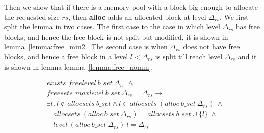 Then we show that if there is a memory pool with a block big enough to allocate the requested size $rs$, then \textbf{alloc} adds an allocated block at level $\Delta_{rs}$. We first split the lemma in two cases. The first case to the case in which level $\Delta_{rs}$ has free blocks, and hence the free block is not split but modified, it is shown in lemma~\ref{lemma:free_min2}. The second case is when $\Delta_{rs}$ does not have free blocks, and hence a free block in a level $l < \Delta_{rs}$ is split till reach level $\Delta_{rs}$ and it is shown in lemma lemma~\ref{lemma:free_nomin}.


\begin{lemma} 
\label{lemma:free_min2}
\end{lemma}
\vspace{-7pt}
\begin{align*}
&exists\_freelevel\ b\_set\ \Delta_{rs}\ \wedge\\
&freesets\_maxlevel\ b\_set\ \Delta_{rs} = \Delta_{rs} \longrightarrow\\ 
&\exists l.\ l \notin allocsets\ b\_set \wedge l \in allocsets\ (alloc\ b\_set\ \Delta_{rs})\ \wedge\\
&\ \ \ \ allocsets\ (alloc\ b\_set\ \Delta_{rs}) = allocsets\ b\_set \cup \lbrace l \rbrace\ \wedge\\
&\ \ \ \ level\ (alloc\ b\_set\ \Delta_{rs})\ l = \Delta_{rs}
\end{align*}
\vspace{-12pt}

